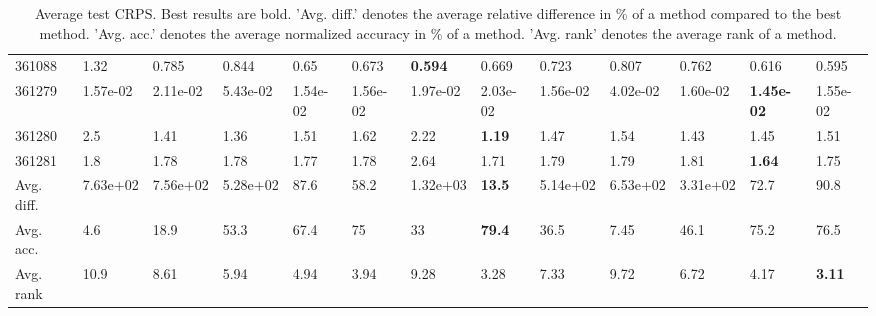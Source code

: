 \begin{table}[ht!]
\begin{tabular}{lllllllllllll}
  361088 & 1.32 & 0.785 & 0.844 & 0.65 & 0.673 & \textbf{0.594} & 0.669 & 0.723 & 0.807 & 0.762 & 0.616 & 0.595 \\ 
  361279 & 1.57e-02 & 2.11e-02 & 5.43e-02 & 1.54e-02 & 1.56e-02 & 1.97e-02 & 2.03e-02 & 1.56e-02 & 4.02e-02 & 1.60e-02 & \textbf{1.45e-02} & 1.55e-02 \\ 
  361280 & 2.5 & 1.41 & 1.36 & 1.51 & 1.62 & 2.22 & \textbf{1.19} & 1.47 & 1.54 & 1.43 & 1.45 & 1.51 \\ 
  361281 & 1.8 & 1.78 & 1.78 & 1.77 & 1.78 & 2.64 & 1.71 & 1.79 & 1.79 & 1.81 & \textbf{1.64} & 1.75 \\ 
   \hline
Avg. diff. & 7.63e+02 & 7.56e+02 & 5.28e+02 & 87.6 & 58.2 & 1.32e+03 & \textbf{13.5} & 5.14e+02 & 6.53e+02 & 3.31e+02 & 72.7 & 90.8 \\ 
  Avg. acc. & 4.6 & 18.9 & 53.3 & 67.4 & 75 & 33 & \textbf{79.4} & 36.5 & 7.45 & 46.1 & 75.2 & 76.5 \\ 
  Avg. rank & 10.9 & 8.61 & 5.94 & 4.94 & 3.94 & 9.28 & 3.28 & 7.33 & 9.72 & 6.72 & 4.17 & \textbf{3.11} \\ 
   \hline
\hline
\end{tabular}
\endgroup
\caption{Average test CRPS. 
                  Best results are bold. 
                  'Avg. diff.' denotes the average relative difference in \% of a method compared to the best method.
                  'Avg. acc.' denotes the average normalized accuracy in \% of a method.
                  'Avg. rank' denotes the average rank of a method.} 
\label{TABLES/table_results_CRPS_spatial_depth}
\end{table}
